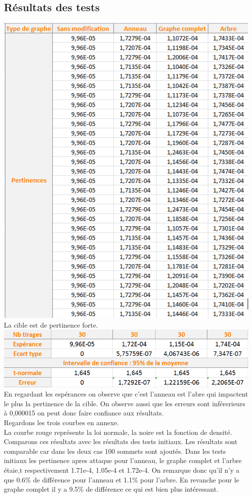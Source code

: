 \documentclass[a4paper,11pt]{article}
\begin{document}
	\subsection{Résultats des tests}
		\includegraphics[scale = 0.5]{Captures/ranking2.PNG}\\
		La cible est de pertinence forte. \\
		\includegraphics[scale = 0.5]{Captures/ranking3.PNG}\\
		En regardant les espérances on observe que c'est l'anneau est l'abre qui impactent le plus la pertinence de la cible.
		On observe aussi que les erreurs sont inférerieurs à 0,000015 on peut donc faire confiance aux résultats.\\
		Regardons les trois courbes en annexe.\\
		La courbe rouge représente la loi normale, la noire est la fonction de densité. 
		Comparons ces résultats avec les résultats des tests initiaux. Les résultats sont comparable car dans les deux cas 100 sommets sont ajoutés. Dans les tests initiaux les pertinence apres attaque pour l'anneau, le graphe complet et l'arbre étaie,t respectivement 1.71e-4, 1.05e-4 et 1.72e-4. On remarque donc qu'il n'y a que 0.6\% de différence pour l'anneau et 1.1\% pour l'arbre. En revanche pour le graphe complet il y a 9.5\% de différence ce qui est bien plus intéressant.
\end{document}
